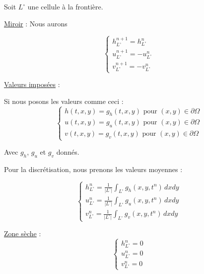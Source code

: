 \documentclass{article}
\begin{document}
Soit $L^{\circ}$ une cellule à la frontière.

\underline{Miroir} : Nous aurons

\[ \left\{ \begin{matrix}
	h_{L^{\circ}}^{n+1} = h_{L^{\circ}}^n  \\
	u_{L^{\circ}}^{n+1} = - u_{L^{\circ}}^n  \\
	v_{L^{\circ}}^{n+1} = - v_{L^{\circ}}^n
\end{matrix} \right. \]

\underline{Valeurs imposées} :

Si nous posons les valeurs comme ceci :
\[ \left\{ \begin{matrix}
	h(t, x, y) = g_h(t, x, y) \text{ pour } (x, y) \in \partial \Omega \\
	u(t, x, y) = g_u(t, x, y) \text{ pour } (x, y) \in \partial \Omega \\
	v(t, x, y) = g_v(t, x, y) \text{ pour } (x, y) \in \partial \Omega
\end{matrix} \right. \]

Avec $g_h$, $g_u$ et $g_v$ donnés.
\newline

Pour la discrétisation, nous prenons les valeurs moyennes :

\[ \left\{ \begin{matrix}
	h_{L^{\circ}}^n = \frac{1}{|L^{\circ}|} \int_{L^{\circ}}{g_h(x, y, t^n) \, dx dy}  \\
	u_{L^{\circ}}^n = \frac{1}{|L^{\circ}|} \int_{L^{\circ}}{g_u(x, y, t^n) \, dx dy}  \\
	v_{L^{\circ}}^n = \frac{1}{|L^{\circ}|} \int_{L^{\circ}}{g_v(x, y, t^n) \, dx dy}
\end{matrix} \right. \]

\underline{Zone sèche} :
\[ \left\{ \begin{matrix}
	h_{L^{\circ}}^n = 0  \\
	u_{L^{\circ}}^n = 0  \\
	v_{L^{\circ}}^n = 0
\end{matrix} \right. \]
\end{document}
